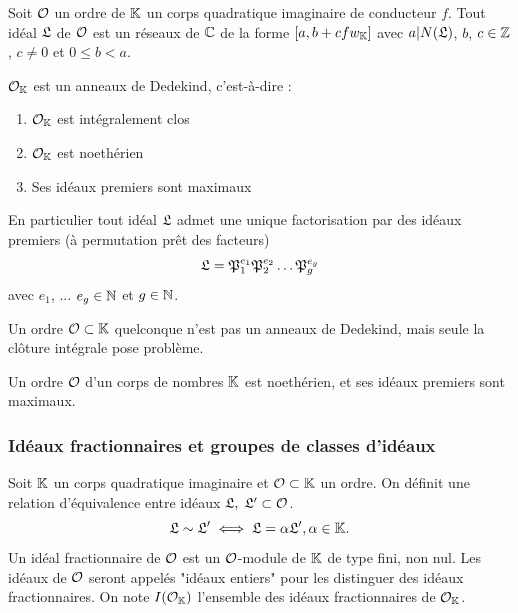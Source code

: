 \begin{Coro}\label{formeIdeauxBaseWk}
	Soit $\mathcal{O}$ un ordre de $\mathbb{K}$ un corps quadratique imaginaire de conducteur $f$. Tout idéal $\mathfrak{L}$ de $\mathcal{O}$ est un réseaux de $\mathbb{C}$ de la forme $\left[ a, b + cfw_{\mathbb{K}}\right]$ avec $a | N(\mathfrak{L})$, $b$, $c\in\mathbb{Z}$, $c\neq 0$ et $0 \leq b< a$. 	
\end{Coro}

\begin{The}
	
	$\mathcal{O}_{\mathbb{K}}$ est un anneaux de Dedekind, c'est-à-dire :
	\begin{enumerate}
		\item $\mathcal{O}_{\mathbb{K}}$ est intégralement clos
		\item $\mathcal{O}_{\mathbb{K}}$ est noethérien
		\item Ses idéaux premiers sont maximaux 
	\end{enumerate}
	En particulier tout idéal $\mathfrak{L}$ admet une unique factorisation par des idéaux premiers (à permutation prêt des facteurs)
	\begin{equation*}
		\mathfrak{L} = \mathfrak{P}_{1}^{e_{1}}\mathfrak{P}_{2}^{e_{2}}\ldots\mathfrak{P}_{g}^{e_{g}}
	\end{equation*}
	avec $e_{1}$, ... $e_{g}\in\mathbb{N}$ et $g\in\mathbb{N}$.
\end{The}

Un ordre $\mathcal{O}\subset\mathbb{K}$ quelconque n'est pas un anneaux de Dedekind, mais seule la clôture intégrale pose problème.

\begin{Prop}
	
	Un ordre $\mathcal{O}$ d'un corps de nombres $\mathbb{K}$ est noethérien, et ses idéaux premiers sont maximaux.
\end{Prop}

\subsubsection{Idéaux fractionnaires et groupes de classes d'idéaux}

\begin{Def}
	Soit $\mathbb{K}$ un corps quadratique imaginaire et $\mathcal{O}\subset\mathbb{K}$ un ordre. On définit une relation d'équivalence entre idéaux $\mathfrak{L},\;\mathfrak{L}'\subset\mathcal{O}$.
	\begin{equation*}
		\mathfrak{L}\sim\mathfrak{L}'\iff\mathfrak{L} = \alpha\mathfrak{L}', \alpha\in\mathbb{K}.
	\end{equation*} 
	Un idéal fractionnaire de $\mathcal{O}$ est un $\mathcal{O}$-module de $\mathbb{K}$ de type fini, non nul. Les idéaux de $\mathcal{O}$ seront appelés "idéaux entiers" pour les distinguer des idéaux fractionnaires. 
	On note $I(\mathcal{O}_{\mathbb{K}})$ l'ensemble des idéaux fractionnaires de $\mathcal{O}_{\mathbb{K}}$.
\end{Def}

